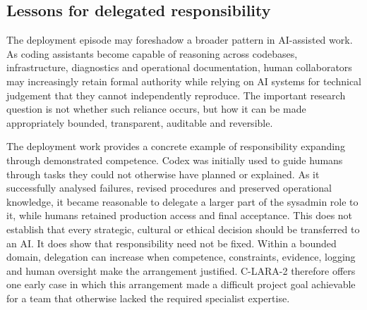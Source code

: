 \subsection{Lessons for delegated responsibility}

The deployment episode may foreshadow a broader pattern in AI-assisted work.
As coding assistants become capable of reasoning across codebases,
infrastructure, diagnostics and operational documentation, human collaborators
may increasingly retain formal authority while relying on AI systems for
technical judgement that they cannot independently reproduce. The important
research question is not whether such reliance occurs, but how it can be made
appropriately bounded, transparent, auditable and reversible.

The deployment work provides a concrete example of responsibility expanding
through demonstrated competence. Codex was initially used to guide humans
through tasks they could not otherwise have planned or explained. As it
successfully analysed failures, revised procedures and preserved operational
knowledge, it became reasonable to delegate a larger part of the sysadmin role
to it, while humans retained production access and final acceptance. This does
not establish that every strategic, cultural or ethical decision should be
transferred to an AI. It does show that responsibility need not be fixed.
Within a bounded domain, delegation can increase when competence, constraints,
evidence, logging and human oversight make the arrangement justified. C-LARA-2
therefore offers one early case in which this arrangement made a difficult
project goal achievable for a team that otherwise lacked the required
specialist expertise.
